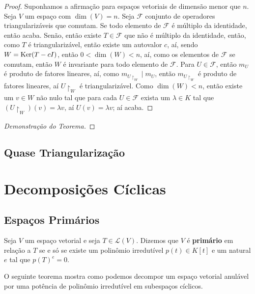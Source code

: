 \documentclass[11pt,twoside,a4paper]{book}
\begin{document}
\begin{proof}
Suponhamos a afirmação para espaços vetoriais de dimensão menor que $n$. Seja $V$ um espaço com $\dim(V)=n$. Seja $\mathcal{F}$ conjunto de operadores triangularizáveis que comutam. Se todo elemento de $\mathcal{F}$ é múltiplo da identidade, então acaba. Senão, então existe $T\in\mathcal{F}$ que não é múltiplo da identidade, então, como $T$ é triangularizável, então existe um autovalor $c$, aí, sendo $W=\operatorname{Ker}(T-cI)$, então $0<\dim(W)<n$, aí, como os elementos de $\mathcal{F}$ se comutam, então $W$ é invariante para todo elemento de $\mathcal{F}$. Para $U\in\mathcal{F}$, então $m_U$ é produto de fatores lineares, aí, como $m_{U\upharpoonright_W}\mid m_U$, então $m_{U\upharpoonright_W}$ é produto de fatores lineares, aí $U\upharpoonright_W$ é triangularizável. Como $\dim(W)<n$, então existe um $v\in W$ não nulo tal que para cada $U\in\mathcal{F}$ exista um $\lambda\in K$ tal que $(U\upharpoonright_W)(v)=\lambda v$, aí $U(v)=\lambda v$; aí acaba.
\end{proof}

\begin{proof}[Demonstração do Teorema]

\end{proof}

\subsection{Quase Triangularização}

\section{Decomposições Cíclicas}

\subsection{Espaços Primários}

\begin{definicao}
Seja $V$ um espaço vetorial e seja $T\in\mathcal{L}(V)$. Dizemos que $V$ é \textbf{primário} em relação a $T$ se e só se existe um polinômio irredutível $p(t)\in K[t]$ e um natural $e$ tal que $p(T)^e=0$.
\end{definicao}

\noindent
O seguinte teorema mostra como podemos decompor um espaço vetorial anulável por uma potência de polinômio irredutível em subespaços cíclicos.
\end{document}
